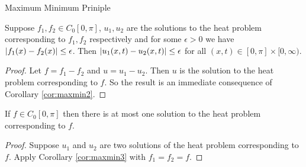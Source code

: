 \begin{section}{Maximum Minimum Priniple}
\begin{cor}\label{cor:maxmin3}
	Suppose $f_1, f_2 \in C_0[0,\pi]$, $u_1, u_2$ are the 
	solutions to the heat problem corresponding to $f_1,
	f_2$ respectively and for some $\epsilon > 0$ we have
	$\left \vert {f_1(x) - f_2(x)} \right \vert \leq \epsilon$. Then
	$\left \vert {u_1(x,t) - u_2(x,t)} \right \vert \leq \epsilon$ for all
	$(x,t) \in [0,\pi] \times [0,\infty)$.
\end{cor}

\begin{proof}
	Let $f = f_1 - f_2$ and $u = u_1 - u_2$. Then $u$ is the
	solution to the heat problem corresponding to $f$. So the
	result is an immediate consequence of Corollary \ref{cor:maxmin2}.
\end{proof}

\begin{thrm}\label{thrm:HeatUnique}
	If $f \in C_0[0,\pi]$ then there is at most one
	solution to the heat problem corresponding to $f$.
\end{thrm}

\begin{proof}
	Suppose $u_1$ and $u_2$ are two solutions of the heat
	problem corresponding to $f$. Apply Corollary \ref{cor:maxmin3}
	with $f_1 = f_2 = f$.
\end{proof}

\end{section}
